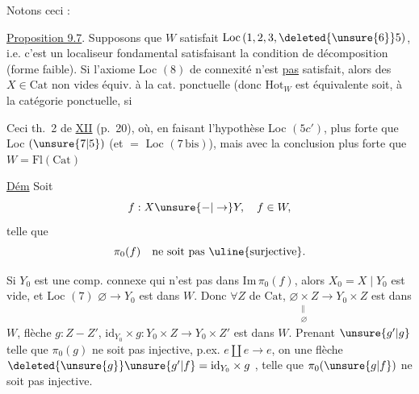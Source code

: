 
Notons ceci :


\uline{Proposition 9.7}. Supposons  que $W$ satisfait $\mathrm{Loc}\,(1,2,3,\deleted{\unsure{6}}5)$, i.e. c'est un localiseur fondamental satisfaisant la condition de décomposition (forme faible).  Si l'axiome Loc $(8)$ de connexité n'est \uline{pas} satisfait, alors  des $X\in\mathrm{Cat}$ non vides  équiv. à la cat. ponctuelle (donc $\mathrm{Hot}_W$ est équivalente soit, à la catégorie ponctuelle,  si




Ceci  th.~2 de \uline{XII} (p.~20),  où, en faisant l'hypothèse Loc $(5c')$, plus forte que Loc $(\unsure{7|5})$ (et $=$ Loc $(7\,\mathrm{bis})$), mais avec la conclusion plus forte que $W=\mathrm{Fl}(\mathrm{Cat})$

\uline{Dém} Soit
\[
 f:X\unsure{-|\to}Y,\quad f\in W,
\]
telle que
\[
 \pi_0(f)\quad\text{ne soit pas \uline{surjective}.}
\]

 Si $Y_0$ est une comp. connexe qui n'est pas dans $\mathrm{Im}\,\pi_0(f)$, alors $X_0=X\mid Y_0$ est vide, et  Loc $(7)$ $\varnothing\to Y_0$ est dans $W$. Donc $\forall Z$ de $\mathrm{Cat}$, $\underset{\substack{\|\\\varnothing}}{\varnothing\times Z}\longrightarrow Y_0\times Z$ est dans $W$,   flèche $g:Z-Z'$, $\mathrm{id}_{Y_0}\times g:Y_0\times Z\to Y_0\times Z'$ est dans $W$. Prenant $\unsure{g'|g}$ telle que $\pi_0(g)$ ne soit pas injective, p.ex. $e\amalg e\to e$, on  une flèche $\deleted{\unsure{g}}\unsure{g'|f}=\mathrm{id}_{Y_0}\times g$ , telle que $\pi_0(\unsure{g|f})$ ne soit pas injective.
